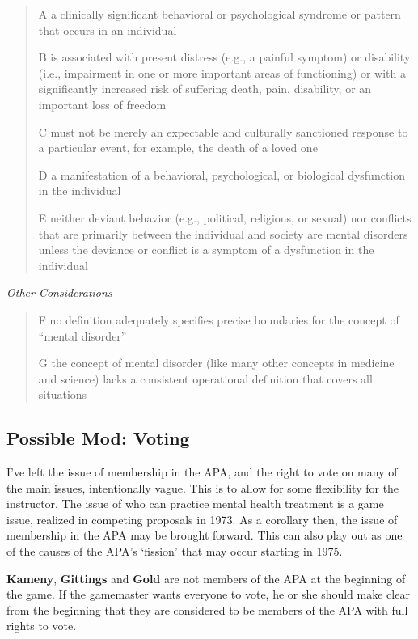 \begin{refsection}
\begin{quote}
A a clinically significant behavioral or psychological syndrome or pattern that occurs in an individual

B is associated with present distress (e.g., a painful symptom) or disability (i.e., impairment in one or more important areas of functioning) or with a significantly increased risk of suffering death, pain, disability, or an important loss of freedom

C must not be merely an expectable and culturally sanctioned response to a particular event, for example, the death of a loved one

D a manifestation of a behavioral, psychological, or biological dysfunction in the individual

E neither deviant behavior (e.g., political, religious, or sexual) nor conflicts that are primarily between the individual and society are mental disorders unless the deviance or conflict is a symptom of a dysfunction in the individual
\end{quote}

\emph{Other Considerations}

\begin{quote}

F no definition adequately specifies precise boundaries for the concept of ``mental disorder''

G the concept of mental disorder (like many other concepts in medicine and science) lacks a consistent operational definition that covers all situations
\end{quote}

\subsection{Possible Mod: Voting}
\label{possiblemod:voting}

I've left the issue of membership in the APA, and the right to vote on many of the main issues, intentionally vague. This is to allow for some flexibility for the instructor. The issue of who can practice mental health treatment is a game issue, realized in competing proposals in 1973. As a corollary then, the issue of membership in the APA may be brought forward. This can also play out as one of the causes of the APA's `fission' that may occur starting in 1975.

\textbf{Kameny}, \textbf{Gittings} and \textbf{Gold} are not members of the APA at the beginning of the game. If the gamemaster wants everyone to vote, he or she should make clear from the beginning that they are considered to be members of the APA with full rights to vote. 


\end{refsection}
